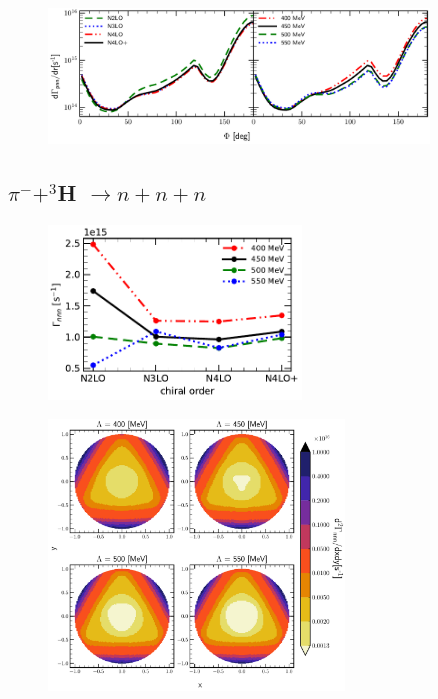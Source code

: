     \begin{figure}[h]
        \begin{center}
        \includegraphics[width=0.9\textwidth]{PlotData/PION/Dalitz_maps/figures/3HE_dGdphi.pdf}
        \end{center}
        \caption{}
        \label{pion_dGdphi}
    \end{figure}


    \clearpage
    \subsection{$\pi^- + ^3$H $\rightarrow n + n + n$}

    \begin{figure}[h]
        \begin{center}
        \includegraphics[width=0.6\textwidth]{PlotData/PION/Dalitz_maps/figures/Gamma_nnn.pdf}
        \end{center}
        \caption{}
        \label{Gamma_nnn}
    \end{figure}


    \begin{figure}[h]
        \begin{center}
        \includegraphics[width=0.7\textwidth]{PlotData/PION/Dalitz_maps/figures/Dalitz_map_nnn_xy_cutofs.pdf}
        \end{center}
        \caption{}
        \label{pion_nnn_xy_cutoff}
    \end{figure}

